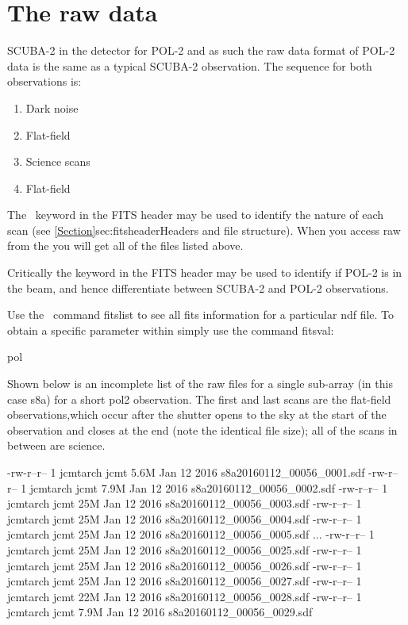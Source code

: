 \section{The raw data}
\label{sec:rawdata}
SCUBA-2 in the detector for POL-2 and as such the raw data format of POL-2 data is
the same as a typical SCUBA-2 observation. The sequence for both observations is:

\begin{enumerate}\itemsep-0.2em
\item Dark noise
\item Flat-field
\item Science scans
\item Flat-field
\end{enumerate}

The \ keyword in the FITS header may be used to identify the nature of each scan (see
\cref{Section}{sec:fitsheader}{Headers and file structure}).  When you
access raw from the  you
will get all of the files listed above. 


Critically the  keyword in the FITS header may be used to
identify if POL-2 is in the beam, and hence differentiate between SCUBA-2 
and POL-2 observations.


\begin{tip}
Use the  \Kappa\ command fitslist to see all fits information for a particular ndf file. 
To obtain a specific parameter within simply use the command fitsval:
\begin{terminalv}
pol
\end{terminalv}
\end{tip}

Shown below is an incomplete list of the raw files for a single sub-array (in this
case s8a) for a short pol2 observation. The first and last
scans are the flat-field observations,which occur after the shutter
opens to the sky at the start of the observation and closes at the end
(note the identical file size); all of the scans in between are
science.


\begin{terminalv}
\end{terminalv}

\begin{terminalv}
-rw-r--r-- 1 jcmtarch jcmt 5.6M Jan 12  2016 s8a20160112_00056_0001.sdf
-rw-r--r-- 1 jcmtarch jcmt 7.9M Jan 12  2016 s8a20160112_00056_0002.sdf
-rw-r--r-- 1 jcmtarch jcmt  25M Jan 12  2016 s8a20160112_00056_0003.sdf
-rw-r--r-- 1 jcmtarch jcmt  25M Jan 12  2016 s8a20160112_00056_0004.sdf
-rw-r--r-- 1 jcmtarch jcmt  25M Jan 12  2016 s8a20160112_00056_0005.sdf
...
-rw-r--r-- 1 jcmtarch jcmt  25M Jan 12  2016 s8a20160112_00056_0025.sdf
-rw-r--r-- 1 jcmtarch jcmt  25M Jan 12  2016 s8a20160112_00056_0026.sdf
-rw-r--r-- 1 jcmtarch jcmt  25M Jan 12  2016 s8a20160112_00056_0027.sdf
-rw-r--r-- 1 jcmtarch jcmt  22M Jan 12  2016 s8a20160112_00056_0028.sdf
-rw-r--r-- 1 jcmtarch jcmt 7.9M Jan 12  2016 s8a20160112_00056_0029.sdf
\end{terminalv}

